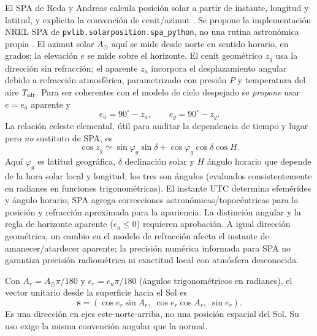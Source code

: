 \documentclass[11pt,a4paper]{article}
\begin{document}
El SPA de Reda y Andreas calcula posición solar a partir de instante, longitud y latitud, y explicita la convención de cenit/azimut \cite{reda2004}. Se propone la implementación NREL SPA de \texttt{pvlib.solarposition.spa\_python}, no una rutina astronómica propia \cite{holmgren2018,pvlibspa}. El azimut solar $A_\odot$ aquí se mide desde norte en sentido horario, en grados; la elevación $e$ se mide sobre el horizonte. El cenit geométrico $z_g$ usa la dirección sin refracción; el aparente $z_a$ incorpora el desplazamiento angular debido a refracción atmosférica, parametrizado con presión $P$ y temperatura del aire $T_{\rm air}$. Para ser coherentes con el modelo de cielo despejado se \emph{propone} usar $e=e_a$ aparente y
\begin{equation}
 e_a=90^\circ-z_a,\qquad e_g=90^\circ-z_g.\label{eq:zenith}
\end{equation}
La relación celeste elemental, útil para auditar la dependencia de tiempo y lugar pero \emph{no} sustituto de SPA, es
\begin{equation}
 \cos z_g\simeq\sin\varphi_g\sin\delta+\cos\varphi_g\cos\delta\cos H.\label{eq:hourangle}
\end{equation}
Aquí $\varphi_g$ es latitud geográfica, $\delta$ declinación solar y $H$ ángulo horario que depende de la hora solar local y longitud; los tres son ángulos (evaluados consistentemente en radianes en funciones trigonométricas). El instante UTC determina efemérides y ángulo horario; SPA agrega correcciones astronómicas/topocéntricas para la posición y refracción aproximada para la apariencia. La distinción angular y la regla de horizonte aparente ($e_a\leq0$) requieren aprobación. A igual dirección geométrica, un cambio en el modelo de refracción afecta el instante de amanecer/atardecer aparente; la precisión numérica informada para SPA no garantiza precisión radiométrica ni exactitud local con atmósfera desconocida.

Con $A_r=A_\odot\pi/180$ y $e_r=e_a\pi/180$ (ángulos trigonométricos en radianes), el vector unitario desde la superficie hacia el Sol es
\begin{equation}
 \mathbf s=(\cos e_r\sin A_r,\;\cos e_r\cos A_r,\;\sin e_r).\label{eq:sunvector}
\end{equation}
Es una dirección en ejes este-norte-arriba, no una posición espacial del Sol. Su uso exige la misma convención angular que la normal.
\end{document}
